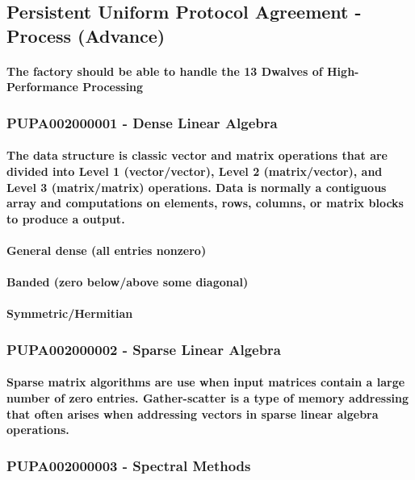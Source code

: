 \subsection{Persistent Uniform Protocol Agreement - Process (Advance)}
\paragraph{ The factory should be able to handle the 13 Dwalves of High-Performance Processing \cite{asanovic2006landscape}}
\subsubsection{PUPA002000001 - Dense Linear Algebra}
\paragraph{The data structure is classic vector and matrix operations that are divided into Level 1 (vector/vector), Level 2 (matrix/vector), and Level 3 (matrix/matrix) operations. Data is normally a contiguous array and computations on elements, rows, columns, or matrix blocks to produce a output.}
\paragraph{General dense (all entries nonzero)}
\paragraph{Banded (zero below/above some diagonal)}
\paragraph{Symmetric/Hermitian}
\subsubsection{PUPA002000002 - Sparse Linear Algebra}
\paragraph{Sparse matrix algorithms are use when input matrices contain a large number of zero entries. Gather-scatter is a type of memory addressing that often arises when addressing vectors in sparse linear algebra operations.}
\subsubsection{PUPA002000003 - Spectral Methods}
